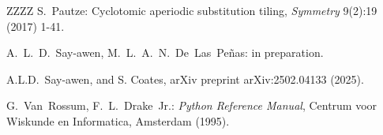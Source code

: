 \documentclass[preprint, 12pt]{article}
\theoremstyle{plain}
\theoremstyle{myremark}
\theoremstyle{definition}
\begin{document}
\begin{thebibliography}{ZZZZ}
S.~Pautze:
Cyclotomic aperiodic substitution tiling,
\emph{Symmetry} 9(2):19 (2017) 1-41.

A.~L.~D.~Say-awen, M.~L.~A.~N.~De~Las~Pe\~nas:
in preparation.

A.L.D.~Say-awen, and S. Coates, arXiv preprint arXiv:2502.04133 (2025).

G.~Van~Rossum, F.~L.~Drake~Jr.:
\emph{Python Reference Manual},
Centrum voor Wiskunde en Informatica, Amsterdam (1995).


\end{thebibliography}
\end{document}
